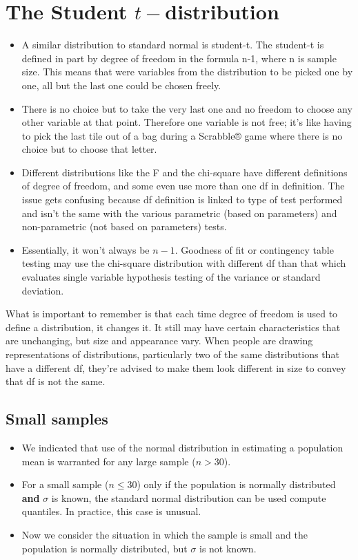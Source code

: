\documentclass[]{report}
\begin{document}


\section*{The Student $t-$distribution}


\begin{itemize}
\item A similar distribution to standard normal is student-t. The student-t is defined in part by degree of freedom in the formula n-1, where n is sample size. This means that were variables from the distribution to be picked one by one, all but the last one could be chosen freely. 
\item There is no choice but to take the very last one and no freedom to choose any other variable at that point. Therefore one variable is not free; it's like having to pick the last tile out of a bag during a Scrabble® game where there is no choice but to choose that letter.

\item Different distributions like the F and the chi-square have different definitions of degree of freedom, and some even use more than one df in definition. The issue gets confusing because df definition is linked to type of test performed and isn't the same with the various parametric (based on parameters) and non-parametric (not based on parameters) tests.
\item Essentially, it won't always be $n-1$. Goodness of fit or contingency table testing may use the chi-square distribution with different df than that which evaluates single variable hypothesis testing of the variance or standard deviation.
\end{itemize}

What is important to remember is that each time degree of freedom is used to define a distribution, it changes it. It still may have certain characteristics that are unchanging, but size and appearance vary. When people are drawing representations of distributions, particularly two of the same distributions that have a different df, they're advised to make them look different in size to convey that df is not the same.




\subsection{Small samples}
\begin{itemize} \item We indicated that use of the normal distribution in estimating a population mean is warranted
for any large sample ($n > 30$). \item For a small sample ($n \leq 30$) only if the population is normally distributed
\textbf{and} $\sigma$ is known, the standard normal distribution can be used compute quantiles. In practice,
this case is unusual.
\item Now we consider the situation in which the sample is small and the population is normally distributed,
but $\sigma$ is not known.
\end{itemize}
\end{document}
